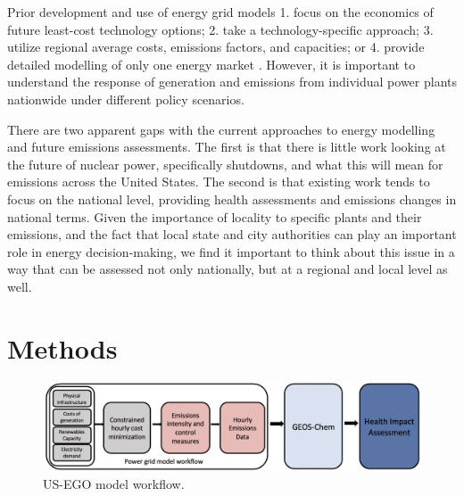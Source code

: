 \documentclass[12]{article}
\begin{document}
Prior development and use of energy grid models 1. focus on the economics of future least-cost technology options; 2. take a technology-specific approach; 3. utilize regional average costs, emissions factors, and capacities; or 4. provide detailed modelling of only one energy market \citep{jenkins_enhanced_nodate, epa_ipm_2018}. However, it is important to understand the response of generation and emissions from individual power plants nationwide under different policy scenarios. 

There are two apparent gaps with the current approaches to energy modelling and future emissions assessments. The first is that there is little work looking at the future of nuclear power, specifically shutdowns, and what this will mean for emissions across the United States. The second is that existing work tends to focus on the national level, providing health assessments and emissions changes in national terms. Given the importance of locality to specific plants and their emissions, and the fact that local state and city authorities can play an important role in energy decision-making, we find it important to think about this issue in a way that can be assessed not only nationally, but at a regional and local level as well. 


\section{Methods}

\begin{figure}[!htb]
    \centering 
    \includegraphics[scale = .5]{US_EGO_flow.png}
    \caption{US-EGO model workflow.}
    \label{fig:my_label}
\end{figure}
\end{document}
